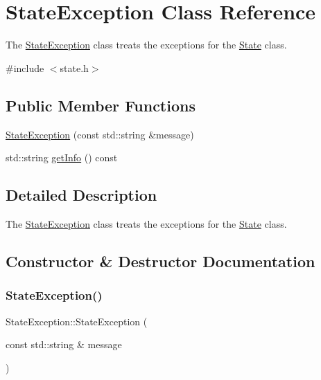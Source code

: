 \hypertarget{class_state_exception}{}\section{State\+Exception Class Reference}
\label{class_state_exception}


The \mbox{\hyperlink{class_state_exception}{State\+Exception}} class treats the exceptions for the \mbox{\hyperlink{class_state}{State}} class.  




{\ttfamily \#include $<$state.\+h$>$}

\subsection*{Public Member Functions}
\begin{DoxyCompactItemize}
\item 
\mbox{\hyperlink{class_state_exception_a17f85b3d1480abb1fc41c9b7441a5bbf}{State\+Exception}} (const std\+::string \&message)
\item 
std\+::string \mbox{\hyperlink{class_state_exception_a2d156f335c06c49eac67a76e854ec8dd}{get\+Info}} () const
\end{DoxyCompactItemize}


\subsection{Detailed Description}
The \mbox{\hyperlink{class_state_exception}{State\+Exception}} class treats the exceptions for the \mbox{\hyperlink{class_state}{State}} class. 

\subsection{Constructor \& Destructor Documentation}
\mbox{\label{class_state_exception_a17f85b3d1480abb1fc41c9b7441a5bbf}} 
\subsubsection{\texorpdfstring{State\+Exception()}{StateException()}}
{\footnotesize\ttfamily State\+Exception\+::\+State\+Exception (\begin{DoxyParamCaption}\item[{const std\+::string \&}]{message }\end{DoxyParamCaption})\hspace{0.3cm}{\ttfamily [inline]}}

